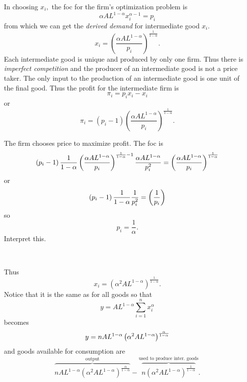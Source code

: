 \documentclass{sebase}
\begin{document}
In choosing $x_{i},$ the foc for the firm's optimization problem is%
\begin{equation*}
\alpha AL^{1-\alpha }x_{i}^{\alpha -1}=p_{i}
\end{equation*}%
from which we can get the \textit{derived demand} for intermediate good $%
x_{i}.$ 
\begin{equation*}
x_{i}=\left( \frac{\alpha AL^{1-\alpha }}{p_{i}}\right) ^{\frac{1}{1-\alpha }%
}.
\end{equation*}%
Each intermediate good is unique and produced by only one firm. Thus there
is \textit{imperfect competition} and the producer of an intermediate good
is not a price taker. The only input to the production of an intermediate
good is one unit of the final good. Thus the profit for the intermediate
firm is 
\begin{equation*}
\pi _{i}=p_{i}x_{i}-x_{i}
\end{equation*}%
or 
\begin{equation*}
\pi _{i}=\left( p_{i}-1\right) \left( \frac{\alpha AL^{1-\alpha }}{p_{i}}%
\right) ^{\frac{1}{1-\alpha }}.
\end{equation*}

\pagebreak

The firm chooses price to maximize profit. The foc is%
\begin{equation*}
\left( p_{i}-1\right) \frac{1}{1-\alpha }\left( \frac{\alpha AL^{1-\alpha }}{%
p_{i}}\right) ^{\frac{1}{1-\alpha }-1}\frac{\alpha AL^{1-\alpha }}{p_{i}^{2}}%
=\left( \frac{\alpha AL^{1-\alpha }}{p_{i}}\right) ^{\frac{1}{1-\alpha }}
\end{equation*}%
or%
\begin{equation*}
\left( p_{i}-1\right) \frac{1}{1-\alpha }\frac{1}{p_{i}^{2}}=\left( \frac{1}{%
p_{i}}\right)
\end{equation*}%
so 
\begin{equation*}
p_{i}=\frac{1}{\alpha }.
\end{equation*}%
Interpret this.\textit{\ }

\pagebreak\ 

Thus%
\begin{equation*}
x_{i}=\left( \alpha ^{2}AL^{1-\alpha }\right) ^{\frac{1}{1-\alpha }}.
\end{equation*}%
Notice that it is the same as for all goods so that%
\begin{equation*}
y=AL^{1-\alpha }\overset{n}{\underset{i=1}{\sum }}x_{i}^{\alpha }
\end{equation*}%
becomes%
\begin{equation*}
y=nAL^{1-\alpha }\left( \alpha ^{2}AL^{1-\alpha }\right) ^{\frac{\alpha }{%
1-\alpha }}
\end{equation*}%
and goods available for consumption are 
\begin{equation*}
\overset{\text{output}}{\overbrace{nAL^{1-\alpha }\left( \alpha
^{2}AL^{1-\alpha }\right) ^{\frac{\alpha }{1-\alpha }}}}-\overset{\text{used
to produce inter. goods}}{\overbrace{n\left( \alpha ^{2}AL^{1-\alpha
}\right) ^{\frac{1}{1-\alpha }}}}.
\end{equation*}%
$\allowbreak $\pagebreak
\end{document}
